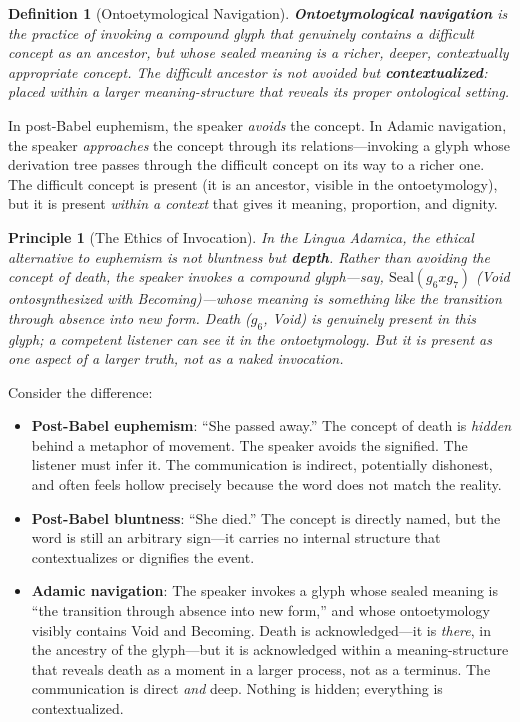 \documentclass[12pt, letterpaper]{book}
\def\otimes{x}%
\def\mathfrak#1{#1}%
\newtheorem{definition}{Definition}[chapter]
\newtheorem{principle}{Principle}[chapter]
\begin{document}
\begin{definition}[Ontoetymological Navigation]\label{def:navigation}
\textbf{Ontoetymological navigation} is the practice of invoking a compound glyph that \textit{genuinely contains} a difficult concept as an ancestor, but whose sealed meaning is a richer, deeper, contextually appropriate concept. The difficult ancestor is not avoided but \textbf{contextualized}: placed within a larger meaning-structure that reveals its proper ontological setting.
\end{definition}

In post-Babel euphemism, the speaker \textit{avoids} the concept. In Adamic navigation, the speaker \textit{approaches} the concept through its relations---invoking a glyph whose derivation tree passes through the difficult concept on its way to a richer one. The difficult concept is present (it is an ancestor, visible in the ontoetymology), but it is present \textit{within a context} that gives it meaning, proportion, and dignity.

\begin{principle}[The Ethics of Invocation]\label{pr:ethics}
In the Lingua Adamica, the ethical alternative to euphemism is not bluntness but \textbf{depth}. Rather than avoiding the concept of death, the speaker invokes a compound glyph---say, $\mathrm{Seal}(\mathfrak{g}_6 \otimes \mathfrak{g}_7)$ (Void ontosynthesized with Becoming)---whose meaning is something like \textit{the transition through absence into new form}. Death ($\mathfrak{g}_6$, Void) is genuinely present in this glyph; a competent listener can see it in the ontoetymology. But it is present as one aspect of a larger truth, not as a naked invocation.
\end{principle}

Consider the difference:

\begin{itemize}
    \item \textbf{Post-Babel euphemism}: ``She passed away.'' The concept of death is \textit{hidden} behind a metaphor of movement. The speaker avoids the signified. The listener must infer it. The communication is indirect, potentially dishonest, and often feels hollow precisely because the word does not match the reality.
    \item \textbf{Post-Babel bluntness}: ``She died.'' The concept is directly named, but the word is still an arbitrary sign---it carries no internal structure that contextualizes or dignifies the event.
    \item \textbf{Adamic navigation}: The speaker invokes a glyph whose sealed meaning is ``the transition through absence into new form,'' and whose ontoetymology visibly contains Void and Becoming. Death is acknowledged---it is \textit{there}, in the ancestry of the glyph---but it is acknowledged within a meaning-structure that reveals death as a moment in a larger process, not as a terminus. The communication is direct \textit{and} deep. Nothing is hidden; everything is contextualized.
\end{itemize}
\end{document}
